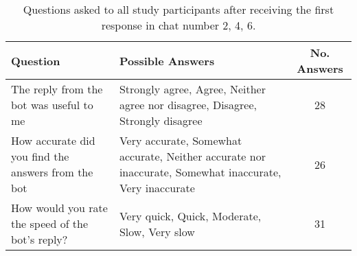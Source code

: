 \renewcommand{\arraystretch}{1.5}
\begin{table}[H]
\centering
{\small
\begin{tabularx}{\textwidth}{@{}X X c@{}}
\toprule
\textbf{Question} & \textbf{Possible Answers} & \textbf{No. Answers} \\ \midrule
The reply from the bot was useful to me & Strongly agree, Agree, Neither agree nor disagree, Disagree, Strongly disagree & 28\\ \hdashline
How accurate did you find the answers from the bot & Very accurate, Somewhat accurate, Neither accurate nor inaccurate, Somewhat inaccurate, Very inaccurate & 26 \\ \hdashline
How would you rate the speed of the bot's reply? & Very quick, Quick, Moderate, Slow, Very slow & 31 \\
\bottomrule
\end{tabularx}
}
\vspace{2mm}
\caption{Questions asked to all study participants after receiving the first response in chat number 2, 4, 6.}
\label{tab:inserted_questions_2_4_6}
\end{table}
